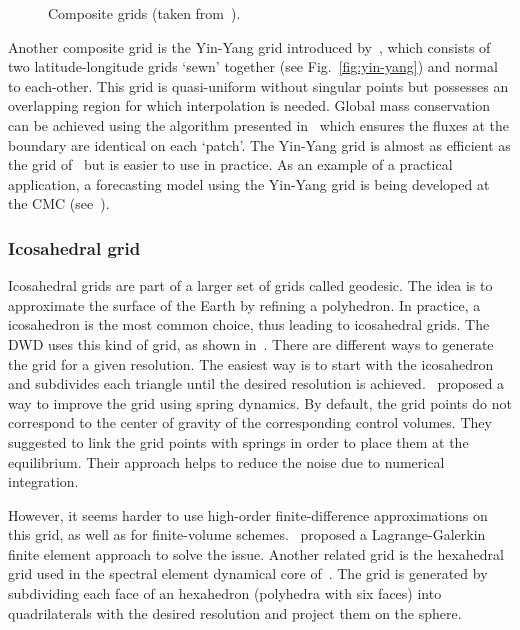 \begin{figure}
  \hfill
  \caption{Composite grids (taken from~\cite{Williamson2007}).}
\end{figure}

Another composite grid is the Yin-Yang grid introduced by~\cite{Kageyama2004},
which consists of two latitude-longitude grids `sewn' together (see
Fig.~\ref{fig:yin-yang}) and normal to each-other.
This grid is quasi-uniform without singular points but possesses an overlapping
region for which interpolation is needed. Global mass conservation can be
achieved using the algorithm presented in~\cite{Peng2006} which ensures the
fluxes at the boundary are identical on each `patch'. The Yin-Yang grid is
almost as efficient as the grid of~\cite{Phillips1957} but is easier to use in
practice. As an example of a practical application, a forecasting model using
the Yin-Yang grid is being developed at the \gls{CMC}
(see~\cite{Qaddouri2011}).

\subsubsection{Icosahedral grid}
Icosahedral grids are part of a larger set of grids called geodesic. The idea is
to approximate the surface of the Earth by refining a polyhedron. In practice, a
icosahedron is the most common choice, thus leading to icosahedral grids. The
\gls{DWD} uses this kind of grid, as shown in~\cite{Majewski2002}. There are
different ways to generate the grid for a given resolution. The easiest way is
to start with the icosahedron and subdivides each triangle until the desired
resolution is achieved.~\cite{Tomita2001} proposed a way to improve the grid
using spring dynamics. By default, the grid points do not correspond to the
center of gravity of the corresponding control volumes. They suggested to link the
grid points with springs in order to place them at the equilibrium. Their approach
helps to reduce the noise due to numerical integration.

However, it seems harder to use high-order finite-difference approximations on
this grid, as well as for finite-volume schemes.~\cite{Giraldo2000} 
proposed a Lagrange-Galerkin finite element approach to solve the issue.
Another related grid is the hexahedral grid used in the spectral element
dynamical core of~\cite{Giraldo2003}. The grid is generated by subdividing each
face of an hexahedron (polyhedra with six faces) into quadrilaterals with the
desired resolution and project them on the sphere.

